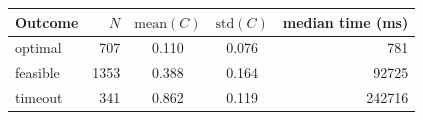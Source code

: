 \begin{tabular}{l r c c r}
\toprule
Outcome & $N$ & $\mathrm{mean}(C)$ & $\mathrm{std}(C)$ & median time (ms)\\
\midrule
optimal & 707 & 0.110 & 0.076 & 781\\
feasible & 1353 & 0.388 & 0.164 & 92725\\
timeout & 341 & 0.862 & 0.119 & 242716\\
\bottomrule
\end{tabular}

